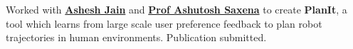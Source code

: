 \documentclass[letterpaper]{deedy-resume} %
\begin{document}
\begin{minipage}[t]{0.66\textwidth}
\sectionspace %



Worked with \textbf{\href{http://www.cs.cornell.edu/~ashesh/}{Ashesh Jain}} and \textbf{\href{http://www.cs.cornell.edu/~asaxena/}{Prof Ashutosh Saxena}} to create \textbf{PlanIt}, a tool which learns from large scale user preference feedback to plan robot trajectories in human environments. Publication submitted.

\sectionspace %













\end{minipage}
\end{document}
